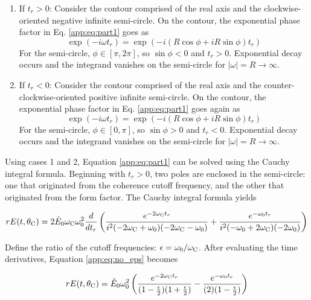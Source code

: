 \documentclass[amsmath,amssymb,aps,prd,10pt,twocolumn]{revtex4}
\begin{document}
\begin{enumerate}
\item If $t_r > 0$: Consider the contour comprised of the real axis and the clockwise-oriented negative infinite semi-circle.  On the contour, the exponential phase factor in Eq. \ref{app:eq:part1} goes as
\begin{equation}
\exp(-i\omega t_r) = \exp(-i(R\cos\phi +iR\sin\phi) t_r)
\end{equation}
For the semi-circle, $\phi \in [\pi,2\pi]$, so $\sin\phi < 0$ and $t_r > 0$.  Exponential decay occurs and the integrand vanishes on the semi-circle for $|\omega| = R \to \infty$.
\item If $t_r < 0$: Consider the contour comprised of the real axis and the counter-clockwise-oriented positive infinite semi-circle.  On the contour, the exponential phase factor in Eq. \ref{app:eq:part1} goes again as
\begin{equation}
\exp(-i\omega t_r) = \exp(-i(R\cos\phi +iR\sin\phi) t_r)
\end{equation}
For the semi-circle, $\phi \in [0,\pi]$, so $\sin\phi > 0$ and $t_r < 0$.  Exponential decay occurs and the integrand vanishes on the semi-circle for $|\omega| = R \to \infty$.
\end{enumerate}

Using cases 1 and 2, Equation \ref{app:eq:part1} can be solved using the Cauchy integral formula.  Beginning with $t_r > 0$, two poles are enclosed in the semi-circle: one that originated from the coherence cutoff frequency, and the other that originated from the form factor.  The Cauchy integral formula yields

\begin{widetext}
\begin{equation}
r E(t,\theta_{\rm C}) = 2 \hat{E}_0 \omega_{\rm C} \omega_{\rm 0}^2 \frac{d}{dt_r} \left( \frac{e^{-2\omega_{\rm C} t_r} }{i^2(-2\omega_{\rm C} + \omega_{\rm 0})(-2\omega_{\rm C}-\omega_{\rm 0})} + \frac{e^{-\omega_{\rm 0}t_r}}{i^2(-\omega_{\rm 0} + 2\omega_{\rm C})(-2\omega_{\rm 0})} \right) \label{app:eq:no_eps}
\end{equation}
\end{widetext}

Define the ratio of the cutoff frequencies: $\epsilon = \omega_{\rm 0}/\omega_{\rm C}$.  After evaluating the time derivatives, Equation \ref{app:eq:no_eps} becomes

\begin{equation}
r E(t,\theta_{\rm C}) = \hat{E}_0 \omega_{\rm 0}^2 \left( \frac{ e^{-2\omega_{\rm C} t_r} }{(1 -\frac{\epsilon}{2})(1+\frac{\epsilon}{2})} - \frac{e^{-\omega_{\rm 0}t_r}}{(2)(1-\frac{\epsilon}{2})} \right) \label{app:eq:yes_eps}
\end{equation}
\end{document}
